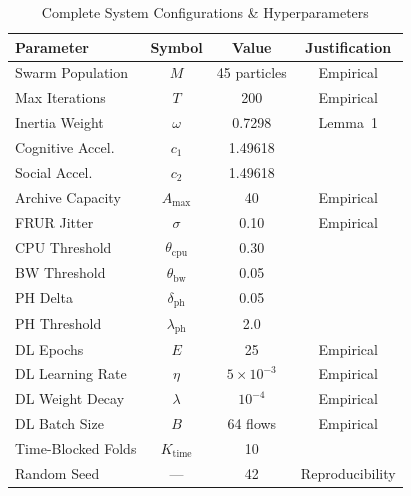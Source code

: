 \documentclass[journal]{IEEEtran}
\begin{document}
\begin{table}[h]
\centering
\small
\caption{Complete System Configurations \& Hyperparameters}
\label{tab:hyperparams}
\begin{tabular}{lccc}
\toprule
\textbf{Parameter} & \textbf{Symbol} & \textbf{Value} & \textbf{Justification} \\
\midrule
Swarm Population     & $M$                    & 45 particles     & Empirical \\
Max Iterations       & $T$                    & 200              & Empirical \\
Inertia Weight       & $\omega$               & 0.7298           & Lemma~1 \\
Cognitive Accel.     & $c_1$                  & 1.49618          & \cite{clerc2002} \\
Social Accel.        & $c_2$                  & 1.49618          & \cite{clerc2002} \\
Archive Capacity     & $A_\text{max}$         & 40               & Empirical \\
FRUR Jitter          & $\sigma$               & 0.10             & Empirical \\
CPU Threshold        & $\theta_\text{cpu}$    & 0.30             & \cite{supraja2024} \\
BW Threshold         & $\theta_\text{bw}$     & 0.05             & \cite{supraja2024} \\
PH Delta             & $\delta_\text{ph}$     & 0.05             & \cite{page1954} \\
PH Threshold         & $\lambda_\text{ph}$    & 2.0              & \cite{page1954} \\
DL Epochs            & $E$                    & 25               & Empirical \\
DL Learning Rate     & $\eta$                 & $5\times10^{-3}$ & Empirical \\
DL Weight Decay      & $\lambda$              & $10^{-4}$        & Empirical \\
DL Batch Size        & $B$                    & 64 flows         & Empirical \\
Time-Blocked Folds   & $K_\text{time}$        & 10               & \cite{holland2024} \\
Random Seed          & ---                    & 42               & Reproducibility \\
\bottomrule
\end{tabular}
\end{table}
\end{document}
